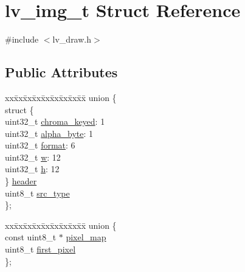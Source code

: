 \hypertarget{structlv__img__t}{}\section{lv\+\_\+img\+\_\+t Struct Reference}
\label{structlv__img__t}


{\ttfamily \#include $<$lv\+\_\+draw.\+h$>$}

\subsection*{Public Attributes}
\begin{DoxyCompactItemize}
\item 
\begin{tabbing}
xx\=xx\=xx\=xx\=xx\=xx\=xx\=xx\=xx\=\kill
union \{\\
\>struct \{\\
\>\>uint32\_t \mbox{\hyperlink{structlv__img__t_ac16ffec041ba16d4bb166c46e35adac0}{chroma\_keyed}}: 1\\
\>\>uint32\_t \mbox{\hyperlink{structlv__img__t_a8f10b1ae414a07a0ab584153c95db288}{alpha\_byte}}: 1\\
\>\>uint32\_t \mbox{\hyperlink{structlv__img__t_adec25ea7fc6c025a980b6e7ff06934bd}{format}}: 6\\
\>\>uint32\_t \mbox{\hyperlink{structlv__img__t_a421ce2a4dfb0a0babec7c311e541a68f}{w}}: 12\\
\>\>uint32\_t \mbox{\hyperlink{structlv__img__t_afd1f5a66e0382c2849b5bc0abbdf21cf}{h}}: 12\\
\>\} \mbox{\hyperlink{structlv__img__t_abdc04070633fcd1558a9cf91c04ccb45}{header}}\\
\>uint8\_t \mbox{\hyperlink{structlv__img__t_a4d708245469601a7e433a15e25cb3f73}{src\_type}}\\
\}; \\

\end{tabbing}\item 
\begin{tabbing}
xx\=xx\=xx\=xx\=xx\=xx\=xx\=xx\=xx\=\kill
union \{\\
\>const uint8\_t $\ast$ \mbox{\hyperlink{structlv__img__t_ab19391939fdb18d70ee9b57e1fe8b69a}{pixel\_map}}\\
\>uint8\_t \mbox{\hyperlink{structlv__img__t_ab4d94043eb51f29141494a649d3f1d2c}{first\_pixel}}\\
\}; \\

\end{tabbing}\end{DoxyCompactItemize}


